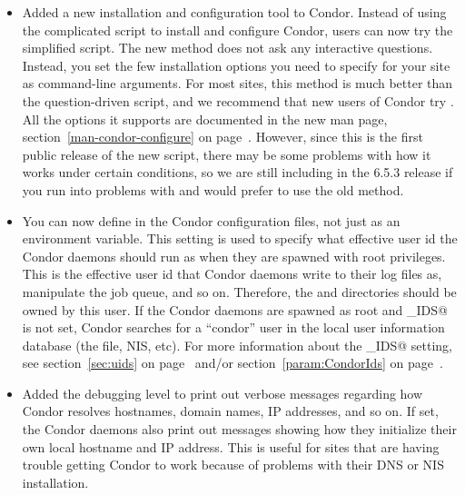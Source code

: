 \begin{itemize}

\item Added a new installation and configuration tool to Condor.
  Instead of using the complicated  script to install
  and configure Condor, users can now try the simplified
   script.
  The new method does not ask any interactive questions.
  Instead, you set the few installation options you need to specify
  for your site as command-line arguments.
  For most sites, this method is much better than the question-driven
   script, and we recommend that new users of Condor
  try .
  All the options it supports are documented in the new
   man page, section~\ref{man-condor-configure} on
  page~\pageref{man-condor-configure}. 
  However, since this is the first public release of the new script,
  there may be some problems with how it works under certain
  conditions, so we are still including  in the 6.5.3 
  release if you run into problems with  and would
  prefer to use the old method. 

\item You can now define  in the Condor
  configuration files, not just as an environment variable.
  This setting is used to specify what effective user id the Condor
  daemons should run as when they are spawned with root privileges.
  This is the effective user id that Condor daemons write to their log
  files as, manipulate the job queue, and so on.
  Therefore, the  and  directories should be
  owned by this user.
  If the Condor daemons are spawned as root and \verb@CONDOR_IDS@ is
  not set, Condor searches for a ``condor'' user in the local user
  information database (the  file, NIS, etc).
  For more information about the \verb@CONDOR_IDS@ setting, see
  section~\ref{sec:uids} on page~\pageref{sec:uids} and/or
  section~\ref{param:CondorIds} on page~\pageref{param:CondorIds}.

\item Added the  debugging level to print out verbose
  messages regarding how Condor resolves hostnames, domain names,
  IP addresses, and so on.
  If set, the Condor daemons also print out messages showing how they
  initialize their own local hostname and IP address.
  This is useful for sites that are having trouble getting Condor to
  work because of problems with their DNS or NIS installation.


\end{itemize}
